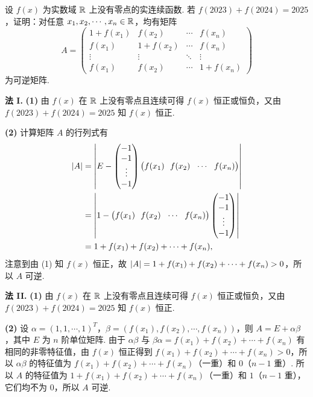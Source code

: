 设 $f(x)$ 为实数域 $\mathbb{R}$ 上没有零点的实连续函数. 若 $f(2023)+f(2024)=2025$，证明：对任意 $x_1,x_2,\cdots,x_n\in\mathbb{R}$，均有矩阵
\[
  A=\begin{pmatrix}
    1+f(x_1) & f(x_2) & \cdots & f(x_n)\\
    f(x_1) & 1+f(x_2) & \cdots & f(x_n)\\
    \vdots & \vdots & \ddots & \vdots\\
    f(x_1) & f(x_2) & \cdots & 1+f(x_n)
  \end{pmatrix}
\]
为可逆矩阵.
\begin{solution}
\textbf{法 I.} \textbf{(1)} 由 $f(x)$ 在 $\mathbb{R}$ 上没有零点且连续可得 $f(x)$ 恒正或恒负，又由 $f(2023)+f(2024)=2025$ 知 $f(x)$ 恒正.

\textbf{(2)} 计算矩阵 $A$ 的行列式有
\begin{align*}
\abs{A}&=\begin{vmatrix}
  E-\begin{pmatrix}-1\\-1\\\vdots\\-1\end{pmatrix}\bigl(f(x_1)\ \ f(x_2)\ \ \cdots\ \ f(x_n)\bigr)
\end{vmatrix}\\
&=\begin{vmatrix}
  1-\bigl(f(x_1)\ \ f(x_2)\ \ \cdots\ \ f(x_n)\bigr)\begin{pmatrix}-1\\-1\\\vdots\\-1\end{pmatrix}
\end{vmatrix}\\
&=1+f(x_1)+f(x_2)+\cdots+f(x_n),
\end{align*}
注意到由 (1) 知 $f(x)$ 恒正，故 $\left|A\right|=1+f(x_1)+f(x_2)+\cdots+f(x_n)>0$，所以 $A$ 可逆.

\textbf{法 II.} \textbf{(1)} 由 $f(x)$ 在 $\mathbb{R}$ 上没有零点且连续可得 $f(x)$ 恒正或恒负，又由 $f(2023)+f(2024)=2025$ 知 $f(x)$ 恒正.

\textbf{(2)} 设 $\alpha=(1,1,\cdots,1)^T$，$\beta=(f(x_1),f(x_2),\cdots,f(x_n))$，则 $A=E+\alpha\beta$，其中 $E$ 为 $n$ 阶单位矩阵. 由于 $\alpha\beta$ 与 $\beta\alpha=f(x_1)+f(x_2)+\cdots+f(x_n)$ 有相同的非零特征值，由 $f(x)$ 恒正得到 $f(x_1)+f(x_2)+\cdots+f(x_n)>0$，所以 $\alpha\beta$ 的特征值为 $f(x_1)+f(x_2)+\cdots+f(x_n)$（一重）和 $0$（$n-1$ 重）. 所以 $A$ 的特征值为 $1+f(x_1)+f(x_2)+\cdots+f(x_n)$（一重）和 $1$（$n-1$ 重），它们均不为 $0$，所以 $A$ 可逆.


\end{solution}

